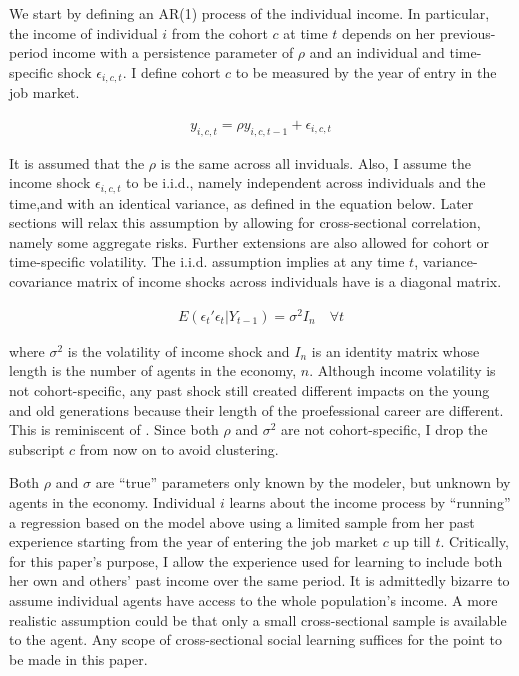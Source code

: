\documentclass[12pt,notitlepage,onecolumn,aps,pra]{article}
\begin{document}
We start by defining an AR(1) process of the individual income. In
particular, the income of individual \(i\) from the cohort \(c\) at time
\(t\) depends on her previous-period income with a persistence parameter
of \(\rho\) and an individual and time-specific shock
\(\epsilon_{i,c,t}\). I define cohort \(c\) to be measured by the year
of entry in the job market.

\begin{eqnarray}
y_{i,c,t} = \rho y_{i,c,t-1} + \epsilon_{i,c,t}
\end{eqnarray}

It is assumed that the \(\rho\) is the same across all inviduals. Also,
I assume the income shock \(\epsilon_{i,c,t}\) to be i.i.d., namely
independent across individuals and the time,and with an identical
variance, as defined in the equation below. Later sections will relax
this assumption by allowing for cross-sectional correlation, namely some
aggregate risks. Further extensions are also allowed for cohort or
time-specific volatility. The i.i.d. assumption implies at any time
\(t\), variance-covariance matrix of income shocks across individuals
have is a diagonal matrix.

\begin{eqnarray}
E(\epsilon_{t}'\epsilon_{t}|Y_{t-1}) = \sigma^2 I_n \quad \forall t 
\end{eqnarray}

where \(\sigma^2\) is the volatility of income shock and \(I_n\) is an
identity matrix whose length is the number of agents in the economy,
\(n\). Although income volatility is not cohort-specific, any past shock
still created different impacts on the young and old generations because
their length of the proefessional career are different. This is
reminiscent of \cite{bansal2004risks}. Since both \(\rho\) and
\(\sigma^2\) are not cohort-specific, I drop the subscript \(c\) from
now on to avoid clustering.

Both \(\rho\) and \(\sigma\) are ``true'' parameters only known by the
modeler, but unknown by agents in the economy. Individual \(i\) learns
about the income process by ``running'' a regression based on the model
above using a limited sample from her past experience starting from the
year of entering the job market \(c\) up till \(t\). Critically, for
this paper's purpose, I allow the experience used for learning to
include both her own and others' past income over the same period. It is
admittedly bizarre to assume individual agents have access to the whole
population's income. A more realistic assumption could be that only a
small cross-sectional sample is available to the agent. Any scope of
cross-sectional social learning suffices for the point to be made in
this paper.
\end{document}

